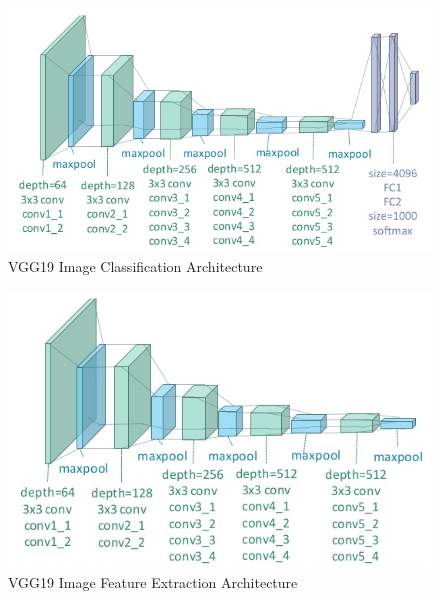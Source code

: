 \documentclass{beamer}
\begin{document}
\begin{frame}
\begin{figure}[H]
\centering
\caption{VGG19 Image Classification Architecture}
\includegraphics[width=\textwidth]{img/vgg19/classification}
\end{figure}
\end{frame}

\begin{frame}
\begin{figure}[H]
\centering
\caption{VGG19 Image Feature Extraction Architecture}
\includegraphics[width=\textwidth]{img/vgg19/feature-extraction}
\end{figure}
\end{frame}
\end{document}
